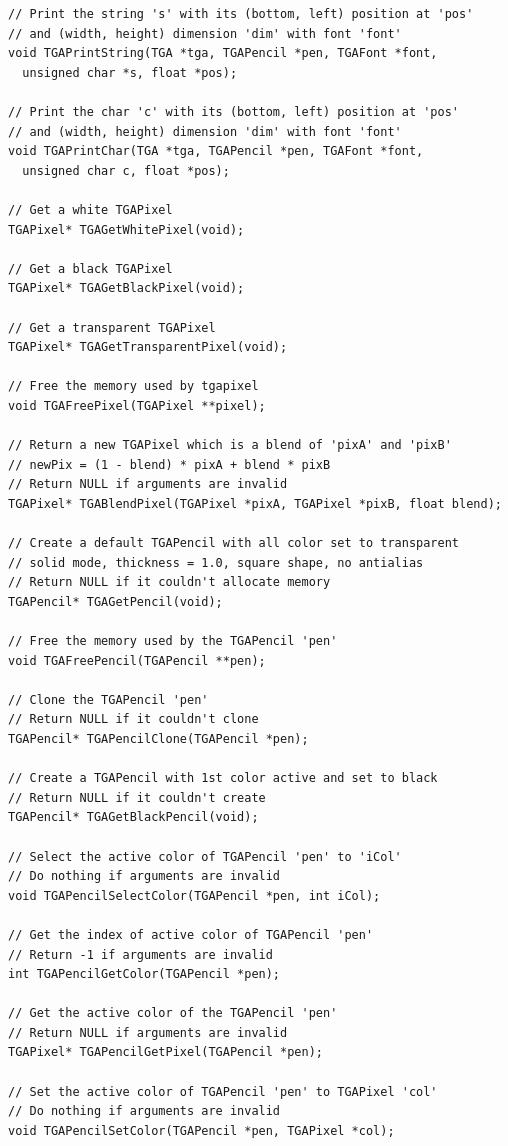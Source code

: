 \documentclass[12pt, a4paper]{article}
\begin{document}
\begin{scriptsize}
\begin{ttfamily}
\begin{lstlisting}
// Print the string 's' with its (bottom, left) position at 'pos'
// and (width, height) dimension 'dim' with font 'font'
void TGAPrintString(TGA *tga, TGAPencil *pen, TGAFont *font, 
  unsigned char *s, float *pos);

// Print the char 'c' with its (bottom, left) position at 'pos'
// and (width, height) dimension 'dim' with font 'font'
void TGAPrintChar(TGA *tga, TGAPencil *pen, TGAFont *font, 
  unsigned char c, float *pos);
  
// Get a white TGAPixel
TGAPixel* TGAGetWhitePixel(void);

// Get a black TGAPixel
TGAPixel* TGAGetBlackPixel(void);

// Get a transparent TGAPixel
TGAPixel* TGAGetTransparentPixel(void);

// Free the memory used by tgapixel
void TGAFreePixel(TGAPixel **pixel);

// Return a new TGAPixel which is a blend of 'pixA' and 'pixB' 
// newPix = (1 - blend) * pixA + blend * pixB
// Return NULL if arguments are invalid
TGAPixel* TGABlendPixel(TGAPixel *pixA, TGAPixel *pixB, float blend);

// Create a default TGAPencil with all color set to transparent
// solid mode, thickness = 1.0, square shape, no antialias
// Return NULL if it couldn't allocate memory
TGAPencil* TGAGetPencil(void);

// Free the memory used by the TGAPencil 'pen'
void TGAFreePencil(TGAPencil **pen);

// Clone the TGAPencil 'pen'
// Return NULL if it couldn't clone
TGAPencil* TGAPencilClone(TGAPencil *pen);

// Create a TGAPencil with 1st color active and set to black
// Return NULL if it couldn't create
TGAPencil* TGAGetBlackPencil(void);

// Select the active color of TGAPencil 'pen' to 'iCol'
// Do nothing if arguments are invalid
void TGAPencilSelectColor(TGAPencil *pen, int iCol);

// Get the index of active color of TGAPencil 'pen'
// Return -1 if arguments are invalid
int TGAPencilGetColor(TGAPencil *pen);

// Get the active color of the TGAPencil 'pen'
// Return NULL if arguments are invalid
TGAPixel* TGAPencilGetPixel(TGAPencil *pen);

// Set the active color of TGAPencil 'pen' to TGAPixel 'col'
// Do nothing if arguments are invalid
void TGAPencilSetColor(TGAPencil *pen, TGAPixel *col);


\end{lstlisting}
\end{ttfamily}
\end{scriptsize}
\end{document}
